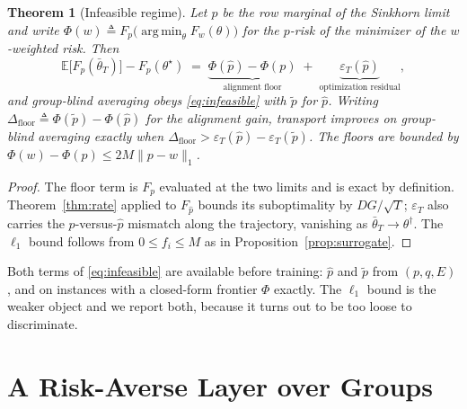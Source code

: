 \documentclass{article}
\newtheorem{theorem}{Theorem}
\theoremstyle{definition}
\newcommand{\E}{\mathbb{E}}
\DeclareMathOperator*{\argmin}{arg\,min}
\begin{document}
\begin{theorem}[Infeasible regime]
\label{thm:infeasible}
Let $\hat p$ be the row marginal of the Sinkhorn limit and write
$\Phi(w)\triangleq F_p\big(\argmin_\theta F_w(\theta)\big)$ for the $p$-risk of
the minimizer of the $w$-weighted risk. Then
\begin{equation}
\E\big[F_p(\bar\theta_T)\big]-F_p(\theta^\star)
\;=\;\underbrace{\Phi(\hat p)-\Phi(p)}_{\text{alignment floor}}
\;+\;\underbrace{\varepsilon_T(\hat p)}_{\text{optimization residual}} ,
\label{eq:infeasible}
\end{equation}
and group-blind averaging obeys \eqref{eq:infeasible} with $\tilde p$ for
$\hat p$. Writing $\Delta_{\mathrm{floor}}\triangleq\Phi(\tilde p)-\Phi(\hat p)$
for the alignment gain, transport improves on group-blind averaging exactly
when $\Delta_{\mathrm{floor}}>\varepsilon_T(\hat p)-\varepsilon_T(\tilde p)$.
The floors are bounded by $\Phi(w)-\Phi(p)\le 2M\|p-w\|_1$.
\end{theorem}
\begin{proof}
The floor term is $F_p$ evaluated at the two limits and is exact by definition.
Theorem~\ref{thm:rate} applied to $F_{\hat p}$ bounds its suboptimality by
$DG/\sqrt{T}$; $\varepsilon_T$ also carries the $p$-versus-$\hat p$ mismatch
along the trajectory, vanishing as $\bar\theta_T\to\theta^\dagger$.
The $\ell_1$ bound follows from $0\le f_i\le M$ as in
Proposition~\ref{prop:surrogate}.
\end{proof}

Both terms of \eqref{eq:infeasible} are available before training: $\hat p$ and
$\tilde p$ from $(p,q,E)$, and on instances with a closed-form frontier
$\Phi$ exactly. The $\ell_1$ bound is the weaker object and we report both,
because it turns out to be too loose to discriminate.

\section{A Risk-Averse Layer over Groups}
\label{sec:cvar}
\end{document}
